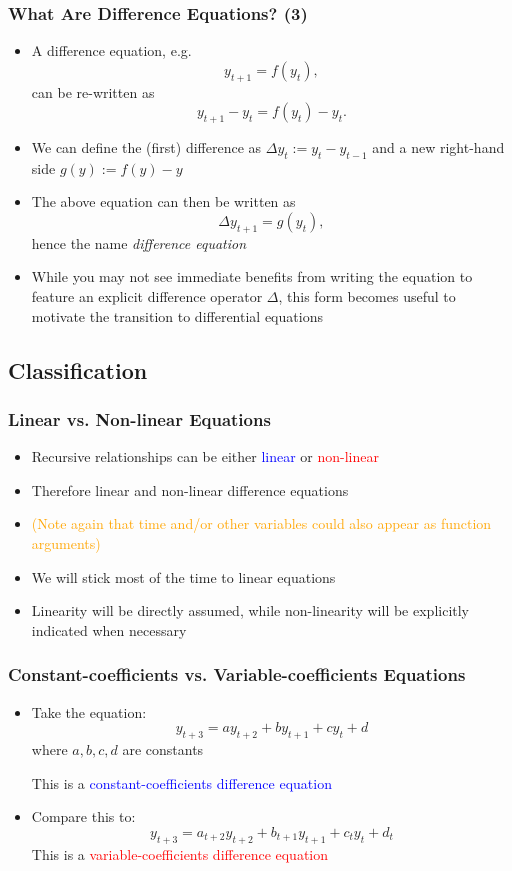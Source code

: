 \documentclass[10pt,usenames,dvipsnames]{beamer}
\theoremstyle{plain}
\theoremstyle{definition}
\begin{document}
\begin{frame}[fragile]
	\frametitle{What Are Difference Equations? (3)}
	\begin{itemize}
		\item A difference equation, e.g. \[ y_{t+1} = f(y_t), \] 
		can be re-written as 
		\[ y_{t+1} - y_t = f(y_t) - y_t. \] 
		\item We can define the (first) difference as $ \Delta y_{t} := y_{t} - y_{t-1} $
	and a new right-hand side $ g(y):= f(y)-y$
		\item The above equation can then be written as 
		\[ \Delta y_{t+1} = g(y_t), \]
		hence the name \textit{difference equation}
		\item While you may not see immediate benefits from writing the equation to feature an explicit difference operator $ \Delta $, this form becomes useful to motivate the transition to differential equations
	\end{itemize}
\end{frame}


\subsection{Classification}
\begin{frame}[fragile]
\frametitle{Linear vs. Non-linear Equations}
\begin{itemize}
	\item Recursive relationships can be either \textcolor{blue}{linear} or \textcolor{red}{non-linear}
	\item Therefore linear and non-linear difference equations
	\item \textcolor{orange}{(Note again that time and/or other variables could also appear as function arguments)}
	\item We will stick most of the time to linear equations
	\item Linearity will be directly assumed, while non-linearity will be explicitly indicated when necessary 
\end{itemize}
\end{frame}

\begin{frame}[fragile]
\frametitle{Constant-coefficients vs. Variable-coefficients Equations}
\begin{itemize}
	\item Take the equation: 
	\[
		y_{t+3} = ay_{t+2} + by_{t+1} + cy_{t} + d
	\]
	where $a,b,c,d$ are constants

	This is a \textcolor{blue}{constant-coefficients difference equation}
	
	\item Compare this to: 
	\[
		y_{t+3} = a_{t+2}y_{t+2} + b_{t+1}y_{t+1} + c_{t}y_{t} + d_{t}
	\]
	This is a \textcolor{red}{variable-coefficients difference equation}
\end{itemize}
\end{frame}
\end{document}
